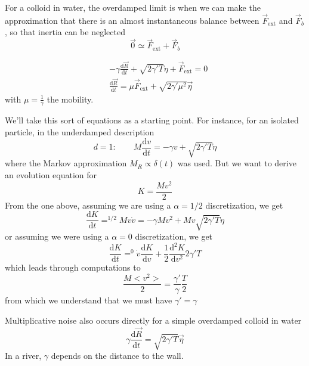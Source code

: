 \documentclass[a4paper]{book}
\theoremstyle{definition}
\theoremstyle{remark}
\begin{document}
For a colloid in water, the overdamped limit is when we can make the approximation that there is an almost instantaneous balance between $\vec{F}_{\text{ext}}$ and $\vec{F}_b$, so that inertia can be neglected
\begin{equation}
    \vec{0} \simeq \vec{F}_{\text{ext}} + \vec{F}_b
\end{equation}

\begin{equation}
    \begin{aligned}
        &-\gamma \frac{\text{d}\vec{R}}{\text{d}t} + \sqrt{2\gamma'T} \eta + \vec{F}_{\text{ext}} = 0 \\
        &\frac{\text{d}\vec{R}}{\text{d}t} = \mu \vec{F}_{\text{ext}} + \sqrt{2\gamma' \mu^2}\vec{\eta}
    \end{aligned}
\end{equation}
with $\mu = \frac{1}{\gamma}$ the mobility.  \par \medskip 

We'll take this sort of equations as a starting point. For instance, for an isolated particle, in the underdamped description
\begin{equation}
    d=1: \qquad  M\frac{\text{d}v}{\text{d}t} = -\gamma v + \sqrt{2\gamma' T }\eta
\end{equation}
where the Markov approximation $M_R \propto \delta(t)$ was used. But we want to derive an evolution equation for 
\begin{equation}
    K = \frac{Mv^2}{2}
\end{equation}
From the one above, assuming we are using a $\alpha = 1/2$ discretization, we get 
\begin{equation}
    \frac{\text{d}K}{\text{d}t} =^{1/2} M v\dot{v} = -\gamma Mv^2 + Mv \sqrt{2\gamma'T}\eta
\end{equation}
or assuming we were using a $\alpha = 0$ discretization, we get 
\begin{equation}
    \frac{\text{d}K}{\text{d}t} =^0 \dot{v}\frac{\text{d}K}{\text{d}v} + \frac{1}{2}\frac{\text{d}^2 K}{\text{d}v^2}2\gamma'T 
\end{equation}
which leads through computations to 
\begin{equation}
    \frac{M<v^2>}{2} = \frac{\gamma'}{\gamma}\frac{T}{2}
\end{equation}
from which we understand that we must have $\gamma' = \gamma$ \par \medskip 

Multiplicative noise also occurs directly for a simple overdamped colloid in water 
\begin{equation}
    \gamma \frac{\text{d}\vec{R}}{\text{d}t} = \sqrt{2\gamma' T}\vec{\eta}
\end{equation}
In a river, $\gamma$ depends on the distance to the wall. 
\end{document}
